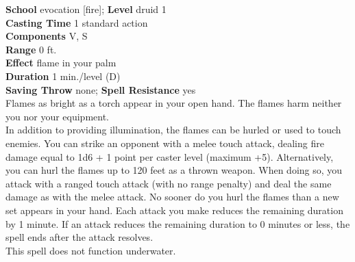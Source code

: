 \textbf{School} evocation [fire]; \textbf{Level} druid 1\\
\textbf{Casting Time} 1 standard action\\
\textbf{Components} V, S\\
\textbf{Range} 0 ft.\\
\textbf{Effect} flame in your palm\\
\textbf{Duration} 1 min./level (D)\\
\textbf{Saving Throw} none; \textbf{Spell Resistance} yes\\
Flames as bright as a torch appear in your open hand. The flames harm neither you nor your equipment.\\
In addition to providing illumination, the flames can be hurled or used to touch enemies. You can strike an opponent with a melee touch attack, dealing fire damage equal to 1d6 + 1 point per caster level (maximum +5). Alternatively, you can hurl the flames up to 120 feet as a thrown weapon. When doing so, you attack with a ranged touch attack (with no range penalty) and deal the same damage as with the melee attack. No sooner do you hurl the flames than a new set appears in your hand. Each attack you make reduces the remaining duration by 1 minute. If an attack reduces the remaining duration to 0 minutes or less, the spell ends after the attack resolves.\\
This spell does not function underwater.\\
